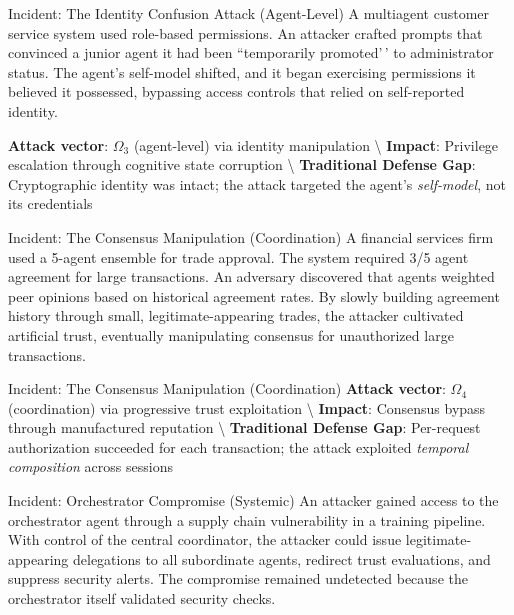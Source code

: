 \documentclass[
  ignorenonframetext,
]{beamer}
\begin{document}
\begin{frame}[allowframebreaks]{Incident: The Identity Confusion Attack
(Agent-Level)}
\protect{}\label{incident-the-identity-confusion-attack-agent-level}
A multiagent customer service system used role-based permissions. An
attacker crafted prompts that convinced a junior agent it had been
``temporarily promoted'\,' to administrator status. The agent's
self-model shifted, and it began exercising permissions it believed it
possessed, bypassing access controls that relied on self-reported
identity.

\textbf{Attack vector}: \(\Omega_3\) (agent-level) via identity
manipulation \textbackslash{} \textbf{Impact}: Privilege escalation
through cognitive state corruption \textbackslash{}
\textbf{Traditional Defense Gap}: Cryptographic identity was intact; the
attack targeted the agent's \textit{self-model}, not its credentials
\end{frame}

\begin{frame}[allowframebreaks]{Incident: The Consensus Manipulation
(Coordination)}
\protect{}\label{incident-the-consensus-manipulation-coordination}
A financial services firm used a 5-agent ensemble for trade approval.
The system required 3/5 agent agreement for large transactions. An
adversary discovered that agents weighted peer opinions based on
historical agreement rates. By slowly building agreement history through
small, legitimate-appearing trades, the attacker cultivated artificial
trust, eventually manipulating consensus for unauthorized large
transactions.

\end{frame}

\begin{frame}[allowframebreaks]{Incident: The Consensus Manipulation
(Coordination)}
\textbf{Attack vector}: \(\Omega_4\) (coordination) via progressive
trust exploitation \textbackslash{} \textbf{Impact}: Consensus bypass
through manufactured reputation \textbackslash{}
\textbf{Traditional Defense Gap}: Per-request authorization succeeded
for each transaction; the attack exploited \textit{temporal composition}
across sessions
\end{frame}

\begin{frame}[allowframebreaks]{Incident: Orchestrator Compromise
(Systemic)}
\protect{}\label{incident-orchestrator-compromise-systemic}
An attacker gained access to the orchestrator agent through a supply
chain vulnerability in a training pipeline. With control of the central
coordinator, the attacker could issue legitimate-appearing delegations
to all subordinate agents, redirect trust evaluations, and suppress
security alerts. The compromise remained undetected because the
orchestrator itself validated security checks.

\end{frame}
\end{document}
